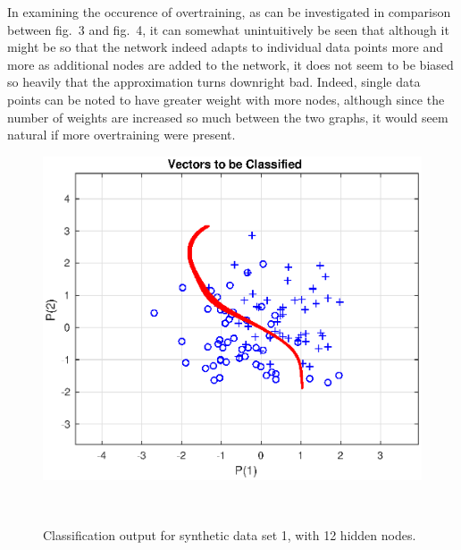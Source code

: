 \documentclass[a4paper,12pt]{article}
\theoremstyle{plain}
\theoremstyle{definition}
\begin{document}
      In examining the occurence of overtraining, as can be investigated in comparison between
      fig.~3 and fig.~4, it can somewhat unintuitively
      be seen that although it might be so that the network indeed adapts to
      individual data points more and more as additional nodes are added to the
      network, it does not seem to be biased so heavily that the approximation
      turns downright bad. Indeed, single data points can be noted to have
      greater weight with more nodes, although since the number of weights are
      increased so much between the two graphs, it would seem natural if more
      overtraining were present.  

      \begin{figure}[H]
         \vspace*{1cm}
         \hspace*{-2cm}
         \centering
         \begin{minipage}[t]{.6\textwidth}		
            \vspace{0pt}
            \centering
            \includegraphics[scale=.6]{8_12_nodes}
            \label{fig:8_12_nodes}
            \caption{Classification output for synthetic data set 1, with 12
            hidden nodes.}
         \end{minipage}~\hspace*{1em}
         \begin{minipage}[t]{.6\textwidth}		
            \vspace{0pt}
            \centering

\end{minipage}
\end{figure}
\end{document}
